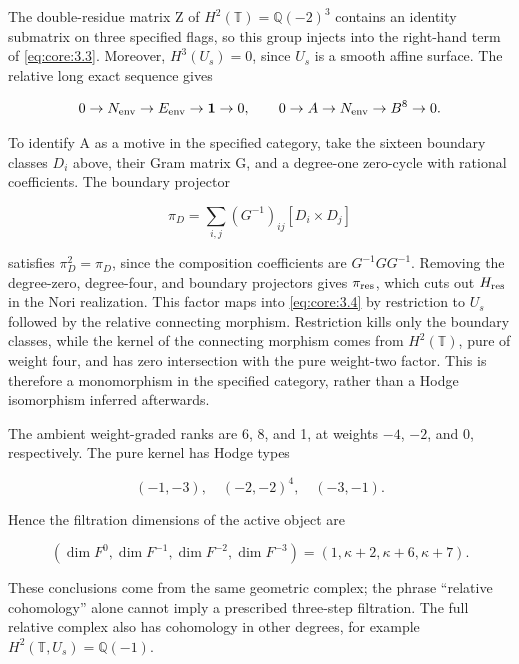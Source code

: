 \documentclass[11pt,a4paper,oneside]{article}
\theoremstyle{plain}
\theoremstyle{definition}
\theoremstyle{remark}
\numberwithin{equation}{section}
\begin{document}
The double-residue matrix Z of \(H^2(\mathbb T)=\mathbb Q(-2)^3\) contains an identity submatrix on three specified flags, so this group injects into the right-hand term of \eqref{eq:core:3.3}. Moreover, \(H^3(U_s)=0\), since \(U_s\) is a smooth affine surface. The relative long exact sequence gives

\begin{equation}
0\to N_{\rm env}\to E_{\rm env}\to\mathbf1\to0,
 \qquad 0\to A\to N_{\rm env}\to B^8\to0.              \label{eq:core:3.4}
\end{equation}

To identify A as a motive in the specified category, take the sixteen boundary classes \(D_i\) above, their Gram matrix G, and a degree-one zero-cycle with rational coefficients. The boundary projector

\begin{equation}
\pi_D=\sum_{i,j}(G^{-1})_{ij}[D_i\times D_j]
\end{equation}

satisfies \(\pi_D^2=\pi_D\), since the composition coefficients are \(G^{-1}GG^{-1}\). Removing the degree-zero, degree-four, and boundary projectors gives \(\pi_{\rm res}\), which cuts out \(H_{\rm res}\) in the Nori realization. This factor maps into \eqref{eq:core:3.4} by restriction to \(U_s\) followed by the relative connecting morphism. Restriction kills only the boundary classes, while the kernel of the connecting morphism comes from \(H^2(\mathbb T)\), pure of weight four, and has zero intersection with the pure weight-two factor. This is therefore a monomorphism in the specified category, rather than a Hodge isomorphism inferred afterwards.

The ambient weight-graded ranks are 6, 8, and 1, at weights \(- 4\), \(- 2\), and 0, respectively. The pure kernel has Hodge types

\begin{equation}
(-1,-3),\quad(-2,-2)^4,\quad(-3,-1).
\end{equation}

Hence the filtration dimensions of the active object are

\begin{equation}
(\dim F^0,\dim F^{-1},\dim F^{-2},\dim F^{-3})
                  =(1,\kappa+2,\kappa+6,\kappa+7).       \label{eq:core:3.5}
\end{equation}

These conclusions come from the same geometric complex; the phrase ``relative cohomology'' alone cannot imply a prescribed three-step filtration. The full relative complex also has cohomology in other degrees, for example \(H^2(\mathbb T,U_s)=\mathbb Q(-1)\).
\end{document}
